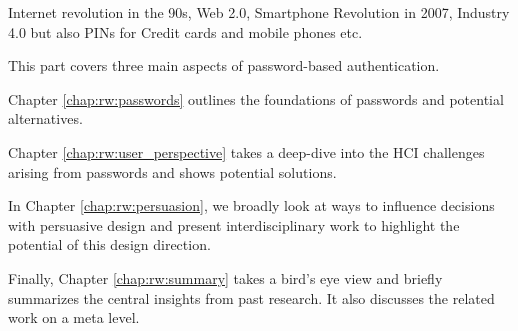 \label{sec:rw:intro}

Internet revolution in the 90s, Web 2.0, Smartphone Revolution in 2007, Industry 4.0
but also PINs for Credit cards and mobile phones etc. 


This part covers three main aspects of password-based authentication. 

Chapter \ref{chap:rw:passwords} outlines the foundations of passwords and potential alternatives. 

Chapter \ref{chap:rw:user_perspective} takes a deep-dive into the HCI challenges arising from passwords and shows potential solutions. 

In Chapter \ref{chap:rw:persuasion}, we broadly look at ways to influence decisions with persuasive design and present interdisciplinary work to highlight the potential of this design direction. 

Finally, Chapter \ref{chap:rw:summary} takes a bird's eye view and briefly summarizes the central insights from past research. It also discusses the related work on a meta level. 

